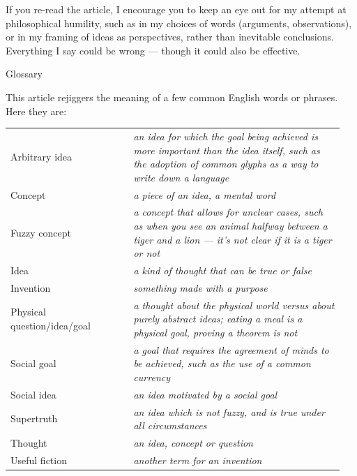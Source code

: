 \documentclass[11pt, oneside]{article}
\theoremstyle{argtstyle}
\begin{document}
If you re-read the article, I encourage you to keep an eye out for my attempt at
philosophical humility, such as in my choices of words (arguments,
observations), or in my framing of ideas as perspectives, rather than inevitable
conclusions.
Everything I say could be wrong --- though it could also be effective.


\pagebreak

{\huge Glossary}
\bigskip

This article rejiggers the meaning of a few common English words or phrases.
Here they are:

\renewcommand{\arraystretch}{2}
\begin{center}
    \begin{tabular}{p{0.35\linewidth} | p{0.6\linewidth}}
        \hfill
        Arbitrary idea & \em an idea for which the goal being achieved
                             is more important than the idea itself, such as the
                             adoption of common glyphs as a way to write down a
                             language \\
        \hfill
        Concept        & \em a piece of an idea, a mental word \\
        \hfill
        Fuzzy concept  & \em a concept that allows for unclear cases, such
                             as when you see an animal halfway between a tiger
                             and a lion --- it's not clear if it is a tiger or
                             not \\
        \hfill
        Idea           & \em a kind of thought that can be true or false \\
        \hfill
        Invention      & \em something made with a purpose \\
        \hfill
        Physical question/idea/goal & \em a thought about the physical world
                             versus about purely abstract ideas; eating a meal
                             is a physical goal, proving a theorem is not \\
        \hfill
        Social goal    & \em a goal that requires the agreement of minds to be
                             achieved, such as the use of a common currency \\
        \hfill
        Social idea    & \em an idea motivated by a social goal \\
        \hfill
        Supertruth     & \em an idea which is not fuzzy, and is true under all
                             circumstances \\
        \hfill
        Thought        & \em an idea, concept or question \\
        \hfill
        Useful fiction & \em another term for an invention \\
    \end{tabular}
\end{center}
\end{document}
